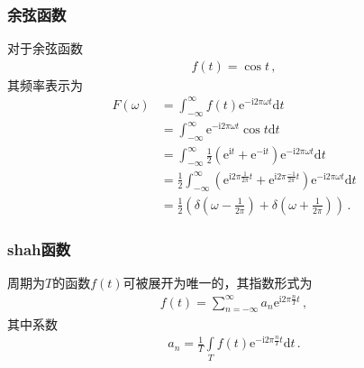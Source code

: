 \subsubsection*{余弦函数}
对于余弦函数
\begin{align}
    f(t)=\cos t\, ,
\end{align}
其频率表示为
\begin{align}
    F(\omega) & =\int_{-\infty}^{\infty}f(t)\mathrm{e}^{-\mathrm{i}2\pi\omega t}\mathrm{d}t\nonumber                                                                                                \\
              & =\int_{-\infty}^{\infty}\mathrm{e}^{-\mathrm{i}2\pi\omega t}\cos t\mathrm{d}t\nonumber                                                                                              \\
              & =\int_{-\infty}^{\infty}\frac{1}{2}(\mathrm{e}^{\mathrm{i}t}+\mathrm{e}^{-\mathrm{i}t})\mathrm{e}^{-\mathrm{i}2\pi\omega t}\mathrm{d}t\nonumber                                     \\
              & =\frac{1}{2}\int_{-\infty}^{\infty}(\mathrm{e}^{\mathrm{i}2\pi\frac{1}{2\pi}t}+\mathrm{e}^{\mathrm{i}2\pi\frac{-1}{2\pi}t})\mathrm{e}^{-\mathrm{i}2\pi\omega t}\mathrm{d}t\nonumber \\
              & =\frac{1}{2}\left(\delta\left(\omega-\frac{1}{2\pi}\right)+\delta\left(\omega+\frac{1}{2\pi}\right)\right)\, .
\end{align}

\subsubsection*{shah函数}
\begin{theorem}
    周期为$T$的函数$f(t)$可被展开为唯一的，其指数形式为
    \begin{align}
        f(t)=\sum\limits_{n=-\infty}^{\infty}a_n\mathrm{e}^{\mathrm{i}2\pi\frac{n}{T}t}\, ,
    \end{align}
    其中系数
    \begin{align}
        a_n=\frac{1}{T}\int\limits_T f(t)\mathrm{e}^{-\mathrm{i}2\pi\frac{n}{T}t}\mathrm{d}t\, .
    \end{align}
\end{theorem}

